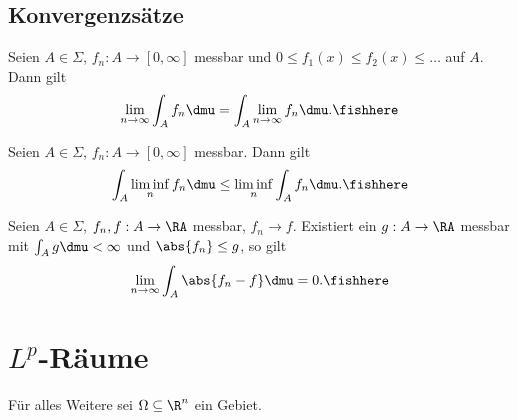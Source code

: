 \subsection{Konvergenzsätze}

\begin{prop}
\label{prop:7.15}
Seien $A\in\Sigma$, $f_n : A\to [0,\infty]$ messbar und $0\le f_1(x)\le f_2(x)
\le \ldots$ auf $A$. Dann gilt
\begin{align*}
\lim\limits_{n\to\infty}\int_A f_n\dmu = 
\int_A \lim\limits_{n\to\infty }f_n \dmu.\fishhere
\end{align*}
\end{prop}

\begin{prop}
\label{prop:7.16}
Seien $A\in\Sigma$, $f_n: A\to [0,\infty]$ messbar. Dann gilt
\begin{align*}
\int_A \liminf_n f_n \dmu \le \liminf_n \int_A f_n\dmu.\fishhere
\end{align*}
\end{prop}

\begin{prop}
\label{prop:7.17}
Seien $A\in\Sigma$, $f_n,f: A\to \RA$ messbar, $f_n\to f$. Existiert ein $g:
A\to \RA$ messbar mit $\int_A g\dmu < \infty$ und $\abs{f_n}\le g$, so gilt
\begin{align*}
\lim\limits_{n\to\infty} \int_A \abs{f_n-f}\dmu = 0.\fishhere 
\end{align*}
\end{prop}

\section{$L^p$-Räume}

Für alles Weitere sei $\Omega\subseteq \R^n$ ein Gebiet.

